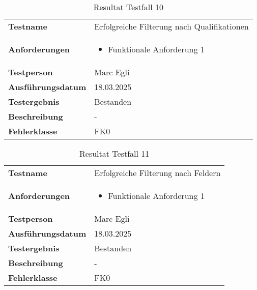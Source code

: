 \begin{table}[H]
    \begin{tabular}{|L{0.3\textwidth}|L{0.65\textwidth}|}
        \hline
           \\[10pt]
        \hline
        \textbf{Testname} & Erfolgreiche Filterung nach Qualifikationen \\
        \hline
        \textbf{Anforderungen} & 
        \begin{itemize}
            \item Funktionale Anforderung 1
        \end{itemize} \\
        \hline
        \textbf{Testperson} & Marc Egli \\
        \hline
        \textbf{Ausführungsdatum} & 18.03.2025 \\
        \hline
        \textbf{Testergebnis} & Bestanden \\
        \hline
        \textbf{Beschreibung} & - \\ 
        \hline
        \textbf{Fehlerklasse} & FK0 \\ 
        \hline
    \end{tabular}
    \caption{Resultat Testfall 10}
\end{table}

\begin{table}[H]
    \begin{tabular}{|L{0.3\textwidth}|L{0.65\textwidth}|}
        \hline
           \\[10pt]
        \hline
        \textbf{Testname} & Erfolgreiche Filterung nach Feldern \\
        \hline
        \textbf{Anforderungen} & 
        \begin{itemize}
            \item Funktionale Anforderung 1
        \end{itemize} \\
        \hline
        \textbf{Testperson} & Marc Egli \\
        \hline
        \textbf{Ausführungsdatum} & 18.03.2025 \\
        \hline
        \textbf{Testergebnis} & Bestanden \\
        \hline
        \textbf{Beschreibung} & - \\ 
        \hline
        \textbf{Fehlerklasse} & FK0 \\ 
        \hline
    \end{tabular}
    \caption{Resultat Testfall 11}
\end{table}

